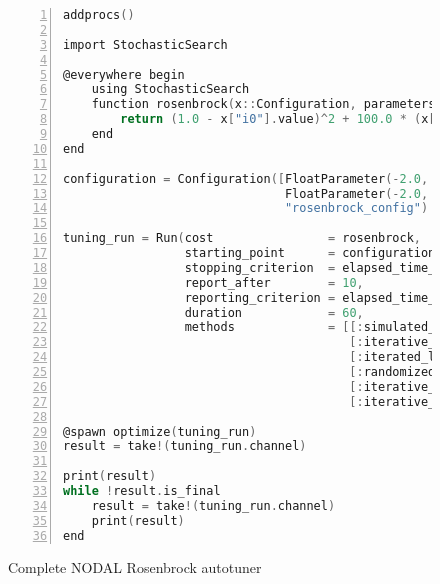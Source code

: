 \begin{figure}[htpb]
    \begin{minipage}{\linewidth}
    \begin{lstlisting}[language=C, basicstyle=\ttfamily\scriptsize,
        numbers=left,
        frame=no, showspaces=false, showstringspaces=false,
        numberstyle=\scriptsize,
        xleftmargin=1.5cm,
        keywords={%
            @spawnat, remotecall, Nullable, Any,
            @spawn,
            @fetch, Future, Array, Float64, julia,
            while, true, function, end, put!,
            take!, sleep, RemoteChannel, Channel,
            Int, Tuple, const, addprocs, @schedule,
            @everywhere, for, in, myid, @async,
            remote_do, workers, Result, Real,
            AbstractFloat, deepcopy, rand, exp, true,
            Function, false, Run, mutable, struct,
            begin, Configuration, Dict, Symbol, using, import,
            ResultChannel, AbstractChannel, return%
        },
        otherkeywords={::, \&, \*, +, -, /, [, ], >, <, put!, take!, neighbor!,
                       update!}
    ]
addprocs()

import StochasticSearch

@everywhere begin
    using StochasticSearch
    function rosenbrock(x::Configuration, parameters::Dict{Symbol, Any})
        return (1.0 - x["i0"].value)^2 + 100.0 * (x["i1"].value - x["i0"].value^2)^2
    end
end

configuration = Configuration([FloatParameter(-2.0, 2.0, 0.0,"i0"),
                               FloatParameter(-2.0, 2.0, 0.0,"i1")],
                               "rosenbrock_config")

tuning_run = Run(cost                = rosenbrock,
                 starting_point      = configuration,
                 stopping_criterion  = elapsed_time_criterion,
                 report_after        = 10,
                 reporting_criterion = elapsed_time_reporting_criterion,
                 duration            = 60,
                 methods             = [[:simulated_annealing 1];
                                        [:iterative_first_improvement 1];
                                        [:iterated_local_search 1];
                                        [:randomized_first_improvement 1];
                                        [:iterative_greedy_construction 1];
                                        [:iterative_probabilistic_improvement 1];])

@spawn optimize(tuning_run)
result = take!(tuning_run.channel)

print(result)
while !result.is_final
    result = take!(tuning_run.channel)
    print(result)
end
    \end{lstlisting}
    \end{minipage}
    \caption{Complete NODAL Rosenbrock autotuner}
    \label{fig:nodal-complete-example}
\end{figure}

